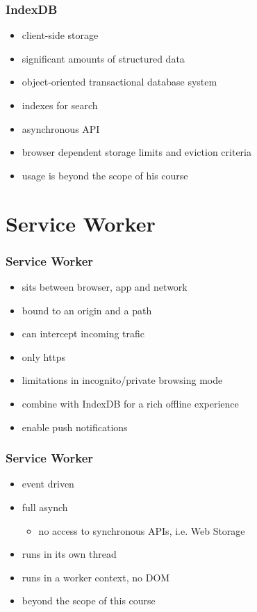 \begin{frame}[fragile]\frametitle{IndexDB}
\color{structure}
\begin{itemize}\color{structure}
  \item client-side storage
  \item significant amounts of structured data
  \item object-oriented transactional database system
  \item indexes for search
  \item asynchronous API
  \item browser dependent storage limits and eviction criteria
  \item usage is beyond the scope of his course
\end{itemize}
\end{frame}

\section{Service Worker}
\begin{frame}[fragile]\frametitle{Service Worker}
\color{structure}
\begin{itemize}\color{structure}
  \item sits between browser, app and network
  \item bound to an origin and a path
  \item can intercept incoming trafic
  \item only https
  \item limitations in incognito/private browsing mode
  \item combine with IndexDB for a rich offline experience
  \item enable push notifications
\end{itemize}
\end{frame}

\begin{frame}[fragile]\frametitle{Service Worker}
\begin{itemize}\color{structure}
  \item event driven
  \item full asynch
  \begin{itemize}
    \item no access to synchronous APIs, i.e. Web Storage
  \end{itemize}
  \item runs in its own thread
  \item runs in a worker context, no DOM
  \item beyond the scope of this course
\end{itemize}
\end{frame}
